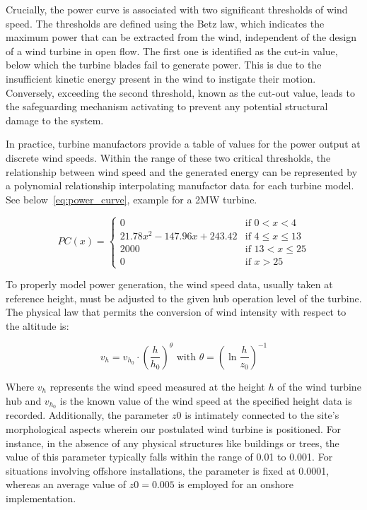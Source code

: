     Crucially, the power curve is associated with two significant thresholds of wind speed.
    The thresholds are defined using the Betz law, which indicates the maximum power that can be extracted from the wind,
    independent of the design of a wind turbine in open flow.
    The first one is identified as the cut-in value, below which the turbine blades fail to generate power.
    This is due to the insufficient kinetic energy present in the wind to instigate their motion.
    Conversely, exceeding the second threshold, known as the cut-out value,
    leads to the safeguarding mechanism activating to prevent any potential structural damage to the system.

    In practice, turbine manufactors provide a table of values for the power output at discrete wind speeds.
    Within the range of these two critical thresholds,
    the relationship between wind speed and the generated energy can be represented by a polynomial relationship
    interpolating manufactor data for each turbine model.
    See below~\ref{eq:power_curve}, example for a 2MW turbine.

    \begin{equation}
        PC(x) =
        \begin{cases}
            0                             & \text{if } 0 <  x < 4 \\
            21.78 x^2 - 147.96 x + 243.42 & \text{if } 4 \leq x \leq 13 \\
            2000                          & \text{if } 13 < x \leq 25 \\
            0                             & \text{if } x > 25
        \end{cases}
    \label{eq:power_curve}
    \end{equation}

    To properly model power generation, the wind speed data, usually taken at reference height,
    must be adjusted to the given hub operation level of the turbine.
    The physical law that permits the conversion of wind intensity with respect to the altitude is:

    \begin{equation}
        v_h= v_{h_0}  \cdot \left(\frac{h}{h_0}\right)^\theta \text { with } \theta=\left(\ln \frac{h}{z_0}\right)^{-1}
    \label{eq:wind_speed_height}
    \end{equation}

    Where $v_{h}$ represents the wind speed measured at the height $h$ of the wind turbine hub
    and $v_{h_0}$ is the known value of the wind speed at the specified height data is recorded.
    Additionally, the parameter $z0$ is intimately connected to the site's morphological aspects wherein our
    postulated wind turbine is positioned.
    For instance, in the absence of any physical structures like buildings or trees,
    the value of this parameter typically falls within the range of 0.01 to 0.001.
    For situations involving offshore installations, the parameter is fixed at 0.0001, whereas
    an average value of $z0 = 0.005$ is employed for an onshore implementation.

